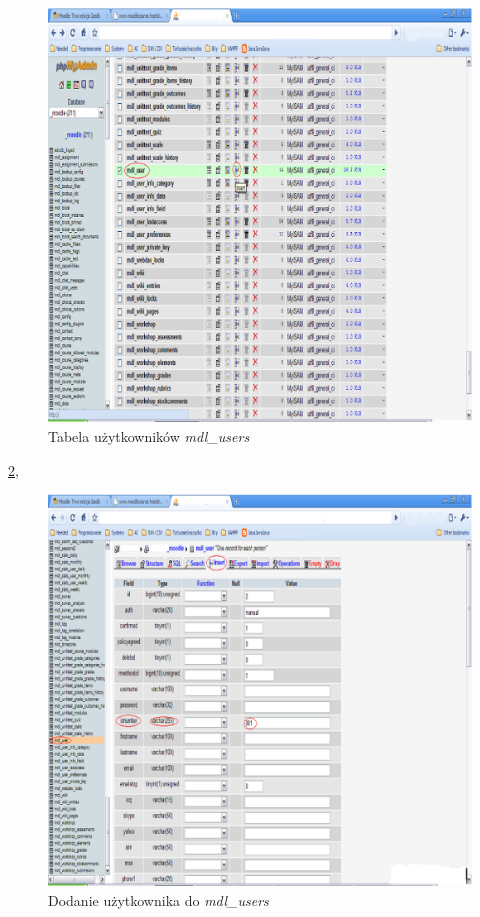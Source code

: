 \begin{figure}[!h]
	\centering
		\caption{Tabela użytkowników \textit{mdl\_users}} \label{rys:baza_users}
		\includegraphics[width=1\textwidth]{projekt_sys//rys//baza_users.eps}
\end{figure}
\ref{rys:insert},
\begin{figure}[!h]
	\centering
		\caption{Dodanie użytkownika do \textit{mdl\_users} } \label{rys:insert}
		\includegraphics[width=1\textwidth]{projekt_sys//rys//insert.eps}
\end{figure}

